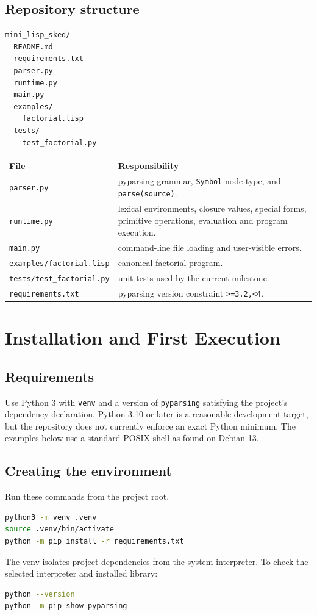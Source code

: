 \documentclass[11pt,a4paper,oneside]{report}
\begin{document}
\section{Repository structure}
\begin{lstlisting}
mini_lisp_sked/
  README.md
  requirements.txt
  parser.py
  runtime.py
  main.py
  examples/
    factorial.lisp
  tests/
    test_factorial.py
\end{lstlisting}
\begin{longtable}{p{}p{}}\toprule File & Responsibility\\\midrule\endhead
\texttt{parser.py} & pyparsing grammar, \texttt{Symbol} node type, and \texttt{parse(source)}.\\
\texttt{runtime.py} & lexical environments, closure values, special forms, primitive operations, evaluation and program execution.\\
\texttt{main.py} & command-line file loading and user-visible errors.\\
\texttt{examples/factorial.lisp} & canonical factorial program.\\
\texttt{tests/test\_factorial.py} & unit tests used by the current milestone.\\
\texttt{requirements.txt} & pyparsing version constraint \texttt{>=3.2,<4}.\\\bottomrule
\end{longtable}

\chapter{Installation and First Execution}
\section{Requirements}
Use Python 3 with \texttt{venv} and a version of \texttt{pyparsing} satisfying the project's dependency declaration. Python 3.10 or later is a reasonable development target, but the repository does not currently enforce an exact Python minimum. The examples below use a standard POSIX shell as found on Debian 13.
\section{Creating the environment}
Run these commands from the project root.
\begin{lstlisting}[language=bash]
python3 -m venv .venv
source .venv/bin/activate
python -m pip install -r requirements.txt
\end{lstlisting}
The venv isolates project dependencies from the system interpreter. To check the selected interpreter and installed library:
\begin{lstlisting}[language=bash]
python --version
python -m pip show pyparsing
\end{lstlisting}
\end{document}
